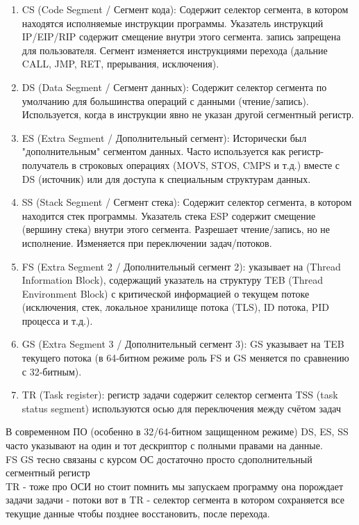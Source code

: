 \documentclass[a4paper,10pt]{article}
\begin{document}
\begin{enumerate}
    \item CS (Code Segment / Сегмент кода): Содержит селектор сегмента, в котором находятся исполняемые инструкции программы. Указатель инструкций IP/EIP/RIP содержит смещение внутри этого сегмента. запись запрещена для пользователя. Сегмент изменяется инструкциями перехода (дальние CALL, JMP, RET, прерывания, исключения).
    \item DS (Data Segment / Сегмент данных): Содержит селектор сегмента по умолчанию для большинства операций с данными (чтение/запись). Используется, когда в инструкции явно не указан другой сегментный регистр.
    \item ES (Extra Segment / Дополнительный сегмент): Исторически был "дополнительным" сегментом данных. Часто используется как регистр-получатель в строковых операциях (MOVS, STOS, CMPS и т.д.) вместе с DS (источник) или для доступа к специальным структурам данных.
    \item SS (Stack Segment / Сегмент стека):  Содержит селектор сегмента, в котором находится стек программы. Указатель стека ESP содержит смещение (вершину стека) внутри этого сегмента. Разрешает чтение/запись, но не исполнение. Изменяется при переключении задач/потоков.
    \item FS (Extra Segment 2 / Дополнительный сегмент 2): указывает на  (Thread Information Block), содержащий указатель на структуру TEB (Thread Environment Block) с критической информацией о текущем потоке (исключения, стек, локальное хранилище потока (TLS), ID потока, PID процесса и т.д.).
    \item GS (Extra Segment 3 / Дополнительный сегмент 3): GS указывает на TEB текущего потока (в 64-битном режиме роль FS и GS меняется по сравнению с 32-битным).
    \item TR (Task register): регистр задачи содержит селектор сегмента TSS (task status segment) используются осью для переключения между счётом задач
\end{enumerate}
В современном ПО (особенно в 32/64-битном защищенном режиме) DS, ES, SS часто указывают на один и тот дескриптор с полными правами на данные. \\
FS GS тесно связаны с курсом ОС достаточно просто сдополнительный сегментный регистр \\
TR - тоже про ОСИ но стоит помнить мы запускаем программу она порождает задачи задачи - потоки вот в TR - селектор сегмента в котором сохраняется все текущие данные чтобы позднее восстановить, после перехода.
\end{document}
